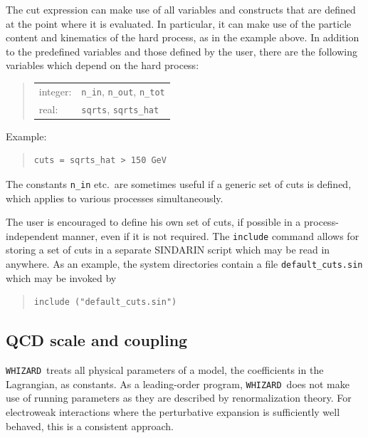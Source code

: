 \documentclass[12pt]{book}
\newcommand{\ttt}[1]{\texttt{#1}}
\newcommand{\whizard}{\texttt{WHIZARD}}
\begin{document}
The cut expression can make use of all variables and constructs that are
defined at the point where it is evaluated.  In particular, it can make use of
the particle content and kinematics of the hard process, as in the example
above.  In addition to the predefined variables and those defined by the user,
there are the following variables which depend on the hard process:
\begin{quote}
\begin{tabular}{ll}
integer: & \ttt{n\_in}, \ttt{n\_out}, \ttt{n\_tot} \\
real: & \ttt{sqrts}, \ttt{sqrts\_hat}
\end{tabular}
\end{quote}
Example:
\begin{quote}
\begin{footnotesize}
\begin{verbatim}
cuts = sqrts_hat > 150 GeV
\end{verbatim}
\end{footnotesize}
\end{quote}
The constants \ttt{n\_in} etc.\ are sometimes useful if a generic set of cuts
is defined, which applies to various processes simultaneously.

The user is encouraged to define his own set of cuts, if possible in a
process-independent manner, even if it is not required.  The \ttt{include}
command allows for storing a set of cuts in a separate SINDARIN script which
may be read in anywhere.  As an example, the system directories contain a file
\verb|default_cuts.sin| which may be invoked by
\begin{quote}
\begin{footnotesize}
\begin{verbatim}
include ("default_cuts.sin")
\end{verbatim}
\end{footnotesize}
\end{quote}


\subsection{QCD scale and coupling}

\whizard\ treats all physical parameters of a model, the coefficients in the
Lagrangian, as constants.  As a leading-order program, \whizard\ does not make
use of running parameters as they are described by renormalization theory.
For electroweak interactions where the perturbative expansion is sufficiently
well behaved, this is a consistent approach.
\end{document}
